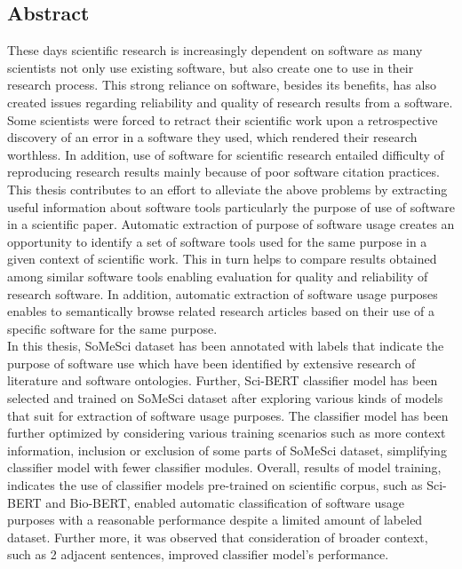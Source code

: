 

\begin{otherlanguage}{american}
	\chapter*{Abstract}

	\medskip
	
	\noindent

\end{otherlanguage}

These days scientific research is increasingly dependent on software as many scientists not only use existing software, but also create one to use in their research process. This strong reliance on software, besides its benefits, has also created issues regarding reliability and quality of research results from a software. Some scientists were forced to retract their scientific work upon a retrospective discovery of an error in a software they used, which rendered their research worthless. In addition, use of software for scientific research entailed difficulty of reproducing research results mainly because of poor software citation practices. \\

This thesis contributes to an effort to alleviate the above problems by extracting useful information about software tools particularly the purpose of use of software in a scientific paper. Automatic extraction of purpose of software usage creates an opportunity to identify a set of software tools used for the same purpose in a given context of scientific work. This in turn helps to compare results obtained among similar software tools enabling evaluation for quality and reliability of research software. In addition, automatic extraction of software usage purposes enables to semantically browse related research articles based on their use of a specific software for the same purpose. \\

In this thesis, SoMeSci dataset has been annotated with labels that indicate the purpose of software use which have been identified by extensive research of literature and software ontologies. Further, Sci-BERT classifier model has been  selected and trained on SoMeSci dataset after exploring various kinds of models that suit for extraction of software usage purposes. The classifier model has been further optimized by considering various training scenarios such as more context information, inclusion or exclusion of some parts of SoMeSci dataset, simplifying classifier model with fewer classifier modules. Overall, results of model training, indicates the use of classifier models pre-trained on scientific corpus, such as Sci-BERT and Bio-BERT, enabled automatic classification of software usage purposes with a reasonable performance despite a limited amount of labeled dataset. Further more, it was observed that consideration of broader context, such as 2 adjacent sentences, improved classifier model’s performance.
